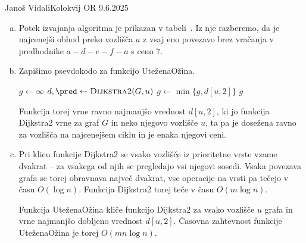 \begin{naloga}{Janoš Vidali}{Kolokvij OR 9.6.2025}
\begin{odgovor}
\begin{enumerate}[(a)]
Denimo sedaj, da vozlišče $s$ leži na najcenejšem ciklu v grafu $G$.
Ker so cene povezav pozitivne,
je ta cikel tudi najcenejši obhod skozi vozlišče $s$ z vsaj eno povezavo,
in tako velja $d[s, 2] = g$.

\item Potek izvajanja algoritma je prikazan v tabeli~\tab.
Iz nje razberemo,
da je najcenejši obhod preko vozlišča $a$ z vsaj eno povezavo
brez vračanja v predhodnike $a - d - e - f - a$ s ceno $7$.

\item Zapišimo psevdokodo za funkcijo {\sc UteženaOžina}.
\begin{small}
\begin{algorithmic}
	\State $g \gets \infty$
		\State $d, \pred \gets \text{\sc{Dijkstra2}}(G, u)$
		\State $g \gets \min\{g, d[u, 2]\}$
	\EndFor
    \State \Return $g$
\EndFunction
\end{algorithmic}
\end{small}
Funkcija torej vrne ravno najmanjšo vrednost $d[u, 2]$,
ki jo funkcija {\sc Dijkstra2} vrne za graf $G$
in neko njegovo vozlišče $u$,
ta pa je dosežena ravno za vozlišča na najcenejšem ciklu
in je enaka njegovi ceni.

\item Pri klicu funkcije {\sc Dijkstra2}
se vsako vozlišče iz prioritetne vrste vzame dvakrat
-- za vsakega od njih se pregledajo vsi njegovi sosedi.
Vsaka povezava grafa se torej obravnava največ dvakrat,
vse operacije na vrsti pa tečejo v času $O(\log n)$.
Funkcija {\sc Dijkstra2} torej teče v času $O(m \log n)$.

Funkcija {\sc UteženaOžina} kliče funkcijo {\sc Dijkstra2}
za vsako vozlišče $u$ grafa in vrne najmanjšo dobljeno vrednost $d[u, 2]$.
Časovna zahtevnost funkcije {\sc UteženaOžina} je torej $O(mn \log n)$.
\end{enumerate}


\end{odgovor}
\end{naloga}
